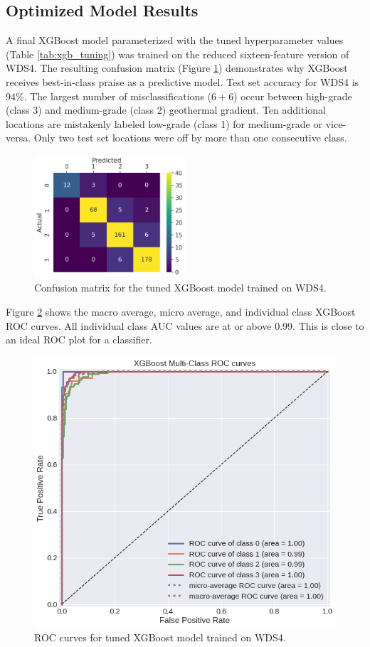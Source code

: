 \subsection{Optimized Model Results}\label{ch5:xgb_final_results}

A final XGBoost model parameterized with the tuned hyperparameter values (Table \ref{tab:xgb_tuning}) was trained on the reduced sixteen-feature version of WDS4. The resulting confusion matrix (Figure \ref{fig:xgb_conf_matrix}) demonstrates why XGBoost receives best-in-class praise as a predictive model. Test set accuracy for WDS4 is 94\%. The largest number of misclassifications ($6+6$) occur between high-grade (class 3) and medium-grade (class 2) geothermal gradient. Ten additional locations are mistakenly labeled low-grade (class 1) for medium-grade or vice-versa. Only two test set locations were off by more than one consecutive class.

\begin{figure}[!htp]
\centering
\includegraphics[width=0.5\textwidth]{templates/images/Figure-XGB16-ConfusionMatrix.png}
\singlespacing
\caption[XGBoost confusion matrix]{Confusion matrix for the tuned XGBoost model trained on WDS4.}
\label{fig:xgb_conf_matrix}
\end{figure}
\pagebreak
Figure \ref{fig:xgb_auc} shows the macro average, micro average, and individual class XGBoost ROC curves. All individual class AUC values are at or above 0.99. This is close to an ideal ROC plot for a classifier.

\begin{figure}[htp]
\centering
\includegraphics[width=.6\textwidth]{templates/images/Figure-XGB16-AUC.png}
\caption[XGBoost ROC curves]{ROC curves for tuned XGBoost model trained on WDS4.}
\label{fig:xgb_auc}
\end{figure}

